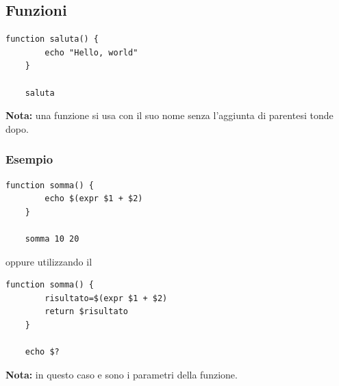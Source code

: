 \documentclass[../main.tex]{subfiles}
\begin{document}
\vspace{1cm}
\subsection{Funzioni}
\begin{lstlisting}[style=bash]
    function saluta() {
        echo "Hello, world"
    }

    saluta
\end{lstlisting}
\textbf{Nota:} una funzione si usa con il suo nome senza l'aggiunta di parentesi tonde dopo.

\vspace{0.25cm}
\subsubsection{Esempio}
\begin{lstlisting}[style=bash]
    function somma() {
        echo $(expr $1 + $2)
    }

    somma 10 20
\end{lstlisting}

oppure utilizzando il 

\begin{lstlisting}[style=bash]
    function somma() {
        risultato=$(expr $1 + $2)
        return $risultato
    }

    echo $?
\end{lstlisting}
\textbf{Nota:} in questo caso  e  sono i parametri della funzione. 
\end{document}
